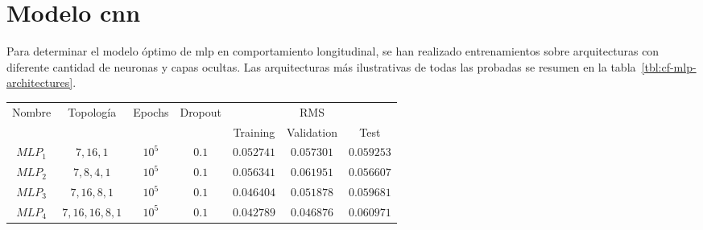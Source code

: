 \section{Modelo \ac{cnn}}



Para determinar el modelo óptimo de \ac{mlp} en comportamiento longitudinal, se han realizado entrenamientos sobre arquitecturas con diferente cantidad de neuronas y capas ocultas. Las arquitecturas más ilustrativas de todas las probadas se resumen en la tabla~\ref{tbl:cf-mlp-architectures}.

\begin{table*}
	\caption[Resumen de las arquitecturas \ac{mlp} para el modelo longitudinal]{Resumen de las arquitecturas de \ac{mlp} para el modelo longitudinal. La posición de cada número de la topología indica la capa, siendo su valor el número de nodos (neuronas) que incluye dicha capa. Las arquitecturas seleccionadas en esta tabla son aquellas consideradas relevantes tras un proceso manual de ensayo y error.}
	\label{tbl:cf-mlp-architectures}
	\begin{tabular}{ccccccc}
		\hline
		\multirow{2}{*}{Nombre} & \multirow{2}{*}{Topología} & \multirow{2}{*}{Epochs} & \multirow{2}{*}{Dropout} & \multicolumn{3}{c}{RMS}      \\
		&                            &                         &                          & Training & Validation & Test \\ \hline
		$MLP_1$ & $7, 16, 1$                 & $10^5$                  & $0.1$                    & $0.052741$      & $0.057301$        & $0.059253$  \\
		$MLP_2$ & $7, 8, 4, 1$               & $10^5$                  & $0.1$                    & $0.056341$      & $0.061951$        & $0.056607$  \\
		$MLP_3$ & $7, 16, 8, 1$              & $10^5$                  & $0.1$                    & $0.046404$      & $0.051878$        & $0.059681$  \\
		$MLP_4$ & $7, 16, 16, 8, 1$          & $10^5$                  & $0.1$                    & $0.042789$      & $0.046876$        & $0.060971$  \\ \hline
	\end{tabular}
\end{table*}


